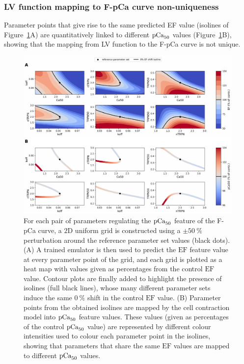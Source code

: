 %
%
%
\subsubsection{LV function mapping to F-pCa curve non-uniqueness}\label{sec:lvtofpcanonuniquemapping}
Parameter points that give rise to the same predicted EF value (isolines of Figure~\ref{fig:EFisolines}A) are quantitatively linked to different $\textrm{pCa}_{50}$ values (Figure~\ref{fig:EFisolines}B), showing that the mapping from LV function to the F-pCa curve is not unique.

\begin{figure}[h!]
    \myfloatalign
    \includegraphics[width=\textwidth]{figures/chapter08/Fig6.pdf}
    \caption{For each pair of parameters regulating the $\textrm{pCa}_{50}$ feature of the F-pCa curve, a $2$D uniform grid is constructed using a $\pm\SI{50}{\percent}$ perturbation around the reference parameter set values (black dots). (A) A trained emulator is then used to predict the $\textrm{EF}$ feature value at every parameter point of the grid, and each grid is plotted as a heat map with values given as percentages from the control $\textrm{EF}$ value. Contour plots are finally added to highlight the presence of isolines (full black lines), whose many different parameter sets induce the same $\SI{0}{\percent}$ shift in the control $\textrm{EF}$ value. (B) Parameter points from the obtained isolines are mapped by the cell contraction model into $\textrm{pCa}_{50}$ feature values. These values (given as percentages of the control $\textrm{pCa}_{50}$ value) are represented by different colour intensities used to colour each parameter point in the isolines, showing that parameters that share the same $\textrm{EF}$ values are mapped to different $\textrm{pCa}_{50}$ values.}
    \label{fig:EFisolines}
\end{figure}


